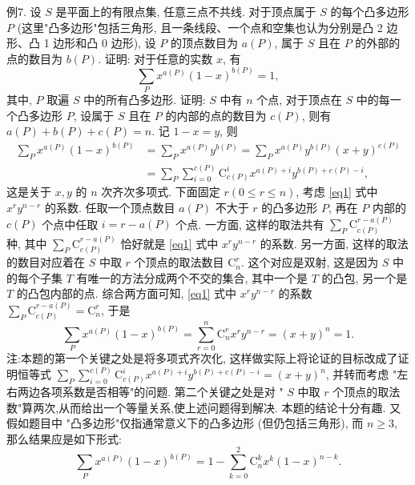 例7. 设 $S$ 是平面上的有限点集, 任意三点不共线.
对于顶点属于 $S$ 的每个凸多边形 $P$ (这里"凸多边形"包括三角形, 且一条线段、一个点和空集也认为分别是凸 2 边形、凸 1 边形和凸 0 边形), 设 $P$ 的顶点数目为 $a(P)$, 属于 $S$ 且在 $P$ 的外部的点的数目为 $b(P)$. 证明: 对于任意的实数 $x$, 有
$$
\sum_P x^{a(P)}(1-x)^{b(P)}=1,
$$
其中, $P$ 取遍 $S$ 中的所有凸多边形.
证明: $S$ 中有 $n$ 个点, 对于顶点在 $S$ 中的每一个凸多边形 $P$, 设属于 $S$ 且在 $P$ 的内部的点的数目为 $c(P)$, 则有 $a(P)+b(P)+c(P)=n$.
记 $1-x=y$, 则
$$
\begin{aligned}
\sum_P x^{a(P)}(1-x)^{b(P)} & =\sum_P x^{a(P)} y^{b(P)}=\sum_P x^{a(P)} y^{b(P)}(x+y)^{c(P)} \\
& =\sum_P \sum_{i=0}^{c(P)} \mathrm{C}_{c(P)}^i x^{a(P)+i} y^{b(P)+c(P)-i}, \label{eq1}
\end{aligned}
$$
这是关于 $x, y$ 的 $n$ 次齐次多项式.
下面固定 $r(0 \leqslant r \leqslant n)$, 考虑 \ref{eq1} 式中 $x^r y^{n-r}$ 的系数.
任取一个顶点数目 $a(P)$ 不大于 $r$ 的凸多边形 $P$, 再在 $P$ 内部的 $c(P)$ 个点中任取 $i=r-a(P)$ 个点.
一方面, 这样的取法共有 $\sum_P \mathrm{C}_{c(P)}^{r-a(P)}$ 种, 其中 $\sum_P \mathrm{C}_{c(P)}^{r-a(P)}$
恰好就是 \ref{eq1} 式中 $x^r y^{n-r}$ 的系数.
另一方面, 这样的取法的数目对应着在 $S$ 中取 $r$ 个顶点的取法数目 $\mathrm{C}_n^r$. 这个对应是双射, 这是因为 $S$ 中的每个子集 $T$ 有唯一的方法分成两个不交的集合, 其中一个是 $T$ 的凸包, 另一个是 $T$ 的凸包内部的点.
综合两方面可知, \ref{eq1} 式中 $x^r y^{n-r}$ 的系数 $\sum_P \mathrm{C}_{c(P)}^{r-a(P)}=\mathrm{C}_n^r$, 于是
$$
\sum_P x^{a(P)}(1-x)^{b(P)}=\sum_{r=0}^n \mathrm{C}_n^r x^r y^{n-r}=(x+y)^n=1 .
$$
注:本题的第一个关键之处是将多项式齐次化, 这样做实际上将论证的目标改成了证明恒等式 $\sum_P \sum_{i=0}^{c(P)} \mathrm{C}_{c(P)}^i x^{a(P)+i} y^{b(P)+c(P)-i}=(x+y)^n$, 并转而考虑 "左右两边各项系数是否相等"的问题.
第二个关键之处是对 " $S$ 中取 $r$ 个顶点的取法数"算两次,从而给出一个等量关系,使上述问题得到解决.
本题的结论十分有趣.
又假如题目中 "凸多边形"仅指通常意义下的凸多边形 (但仍包括三角形), 而 $n \geqslant 3$, 那么结果应是如下形式:
$$
\sum_P x^{a(P)}(1-x)^{b(P)}=1-\sum_{k=0}^2 \mathrm{C}_n^k x^k(1-x)^{n-k} .
$$


